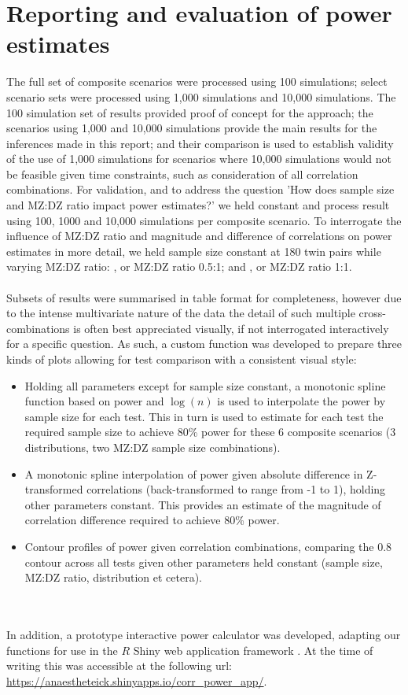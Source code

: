 \section{Reporting and evaluation of power estimates}
The full set of composite scenarios were processed using 100 simulations; select scenario sets were processed using 1,000 simulations and 10,000 simulations.  The 100 simulation set of results provided proof of concept for the approach; the scenarios using 1,000 and 10,000 simulations provide the main results for the inferences made in this report; and their comparison is used to establish validity of the use of 1,000 simulations for scenarios where 10,000 simulations would not be feasible given time constraints, such as consideration of all correlation combinations.  For validation, and to address the question 'How does sample size and MZ:DZ ratio impact power estimates?' we held constant  and process result using 100, 1000 and 10,000 simulations per composite scenario.  To interrogate the influence of MZ:DZ ratio and magnitude and difference of correlations on power estimates in more detail, we held sample size constant at 180 twin pairs while varying MZ:DZ ratio:  , or MZ:DZ ratio 0.5:1; and  , or MZ:DZ ratio 1:1.
\\
\\
Subsets of results were summarised in table format for completeness, however due to the intense multivariate nature of the data the detail of such multiple cross-combinations is often best appreciated visually, if not interrogated interactively for a specific question.  As such, a custom function was developed to prepare three kinds of plots allowing for test comparison with a consistent visual style: 
\begin{itemize}
\item Holding all parameters except for sample size constant, a monotonic spline function based on power and $\log(n)$ is used to interpolate the power by sample size for each test. This in turn is used to estimate for each test the required sample size to achieve 80\% power for these 6 composite scenarios (3 distributions, two MZ:DZ sample size combinations).
\item A monotonic spline interpolation of power given absolute difference in  Z-transformed correlations (back-transformed to range from -1 to 1), holding other parameters constant.  This provides an estimate of the magnitude of correlation difference required to achieve 80\% power.
\item Contour profiles of power given correlation combinations, comparing the 0.8 contour across all tests given other parameters held constant (sample size, MZ:DZ ratio, distribution et cetera).
\end{itemize}
\\
\\
In addition, a prototype interactive power calculator was developed, adapting our functions for use in the $R$ Shiny web application framework \cite{r_shiny}.  At the time of writing this was accessible at the following url:  \href{https://anaestheteick.shinyapps.io/corr_power_app/}{https://anaestheteick.shinyapps.io/corr\_power\_app/}.